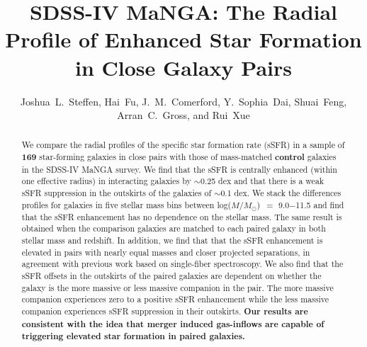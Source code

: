 \documentclass[iop,revtex4,twocolumn,apj,numberedappendix,appendixfloats]{emulateapj}
\newcommand{\logm}{log($M/M_{\odot}$)}
\begin{document}
\title{
SDSS-IV MaNGA: The Radial Profile of Enhanced Star Formation in Close Galaxy Pairs
}

\author{
Joshua~L.~Steffen, Hai~Fu, J.~M.~Comerford, Y.~Sophia~Dai, Shuai~Feng, Arran~C.~Gross, and Rui~Xue
}

\begin{abstract}
We compare the radial profiles of the specific star formation rate (sSFR) in a sample of \textbf{169} star-forming galaxies in close pairs with those of mass-matched \textbf{control} galaxies in the SDSS-IV MaNGA survey. We find that the sSFR is centrally enhanced (within one effective radius) in interacting galaxies by $\sim$0.25 dex and that there is a weak sSFR suppression in the outskirts of the galaxies of $\sim$0.1 dex. We stack the differences profiles for galaxies in five stellar mass bins between \logm\ $=$ 9.0$-$11.5 and find that the sSFR enhancement has no dependence on the stellar mass. The same result is obtained when the comparison galaxies are matched to each paired galaxy in both stellar mass and redshift. In addition, we find that that the sSFR enhancement is elevated in pairs with nearly equal masses and closer projected separations, in agreement with previous work based on single-fiber spectroscopy. We also find that the sSFR offsets in the outskirts of the paired galaxies are dependent on whether the galaxy is the more massive or less massive companion in the pair. The more massive companion experiences zero to a positive sSFR enhancement while the less massive companion experiences sSFR suppression in their outskirts. \textbf{Our results are consistent with the idea that merger induced gas-inflows are capable of triggering elevated star formation in paired galaxies. }
\end{abstract}
\end{document}
